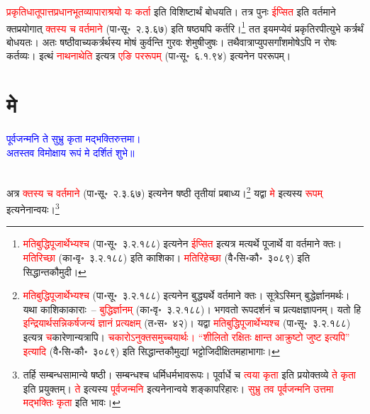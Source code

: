 \begin{sloppypar}
\textcolor{red}{प्रकृतिधातूपात्त\-प्रधान\-भूत\-व्यापाराश्रयो यः कर्ता} इति विशिष्टार्थं बोधयति। तत्र पुनः \textcolor{red}{ईप्सित} इति वर्तमाने क्तप्रयोगात् \textcolor{red}{क्तस्य च वर्तमाने} (पा॰सू॰~२.३.६७) इति षष्ठ्यपि कर्तरि।\footnote{\textcolor{red}{मति\-बुद्धि\-पूजार्थेभ्यश्च} (पा॰सू॰~३.२.१८८) इत्यनेन \textcolor{red}{ईप्सित} इत्यत्र मत्यर्थे पूजार्थे वा वर्तमाने क्तः। \textcolor{red}{मतिरिच्छा} (का॰वृ॰~३.२.१८८) इति काशिका। \textcolor{red}{मतिरिहेच्छा} (वै॰सि॰कौ॰~३०८९) इति सिद्धान्त\-कौमुदी।} तत इयमप्येवं प्रकृतिरपीत्युभे
कर्त्रर्थं बोधयतः। अतः
षष्ठी\-वाच्य\-कर्त्रर्थस्य मोषं कुर्वन्ति गुरवः शेमुषीजुषः। तथैवात्राप्युपसर्गांश\-मोषेऽपि न रोषः कर्तव्यः। इत्थं \textcolor{red}{नाथनाथेति} इत्यत्र \textcolor{red}{एङि पररूपम्‌} (पा॰सू॰~६.१.९४) इत्यनेन पररूपम्।\end{sloppypar}
\section[मे]{मे}
\centering\textcolor{blue}{पूर्वजन्मनि ते सुभ्रु कृता मद्भक्तिरुत्तमा।\nopagebreak\\
अतस्तव विमोक्षाय रूपं मे दर्शितं शुभे॥}\nopagebreak\\
\\
\begin{sloppypar}\justifying\noindent\hspace{10mm} अत्र \textcolor{red}{क्तस्य च वर्तमाने} (पा॰सू॰~२.३.६७) इत्यनेन षष्ठी तृतीयां प्रबाध्य।\footnote{\textcolor{red}{मति\-बुद्धि\-पूजार्थेभ्यश्च} (पा॰सू॰~३.२.१८८) इत्यनेन बुद्ध्यर्थे वर्तमाने क्तः। सूत्रेऽस्मिन् बुद्धेर्ज्ञानमर्थः। यथा काशिकाकाराः~– \textcolor{red}{बुद्धिर्ज्ञानम्‌} (का॰वृ॰~३.२.१८८)। भगवतो रूपदर्शनं च प्रत्यक्ष\-ज्ञापनम्। यतो हि \textcolor{red}{इन्द्रियार्थ\-सन्निकर्ष\-जन्यं ज्ञानं प्रत्यक्षम्‌} (त॰स॰~४२)। यद्वा \textcolor{red}{मति\-बुद्धि\-पूजार्थेभ्यश्च} (पा॰सू॰~३.२.१८८) इत्यत्र \textcolor{red}{च}कारेणान्यत्रापि। \textcolor{red}{चकारोऽनुक्त\-समुच्चयार्थः। “शीलितो रक्षितः क्षान्त आक्रुष्टो जुष्ट इत्यपि” इत्यादि} (वै॰सि॰कौ॰~३०८९) इति सिद्धान्त\-कौमुद्यां भट्टोजि\-दीक्षित\-महाभागाः।} यद्वा \textcolor{red}{मे} इत्यस्य \textcolor{red}{रूपम्‌} इत्यनेनान्वयः।\footnote{तर्हि सम्बन्ध\-सामान्ये षष्ठी। सम्बन्धश्च धर्मि\-धर्म\-भाव\-रूपः। पूर्वार्धे च \textcolor{red}{त्वया कृता} इति प्रयोक्तव्ये \textcolor{red}{ते कृता} इति प्रयुक्तम्। \textcolor{red}{ते} इत्यस्य \textcolor{red}{पूर्वजन्मनि} इत्यनेनान्वये शङ्कापरिहारः। \textcolor{red}{सुभ्रु तव पूर्वजन्मनि उत्तमा मद्भक्तिः कृता} इति भावः।}\end{sloppypar}
